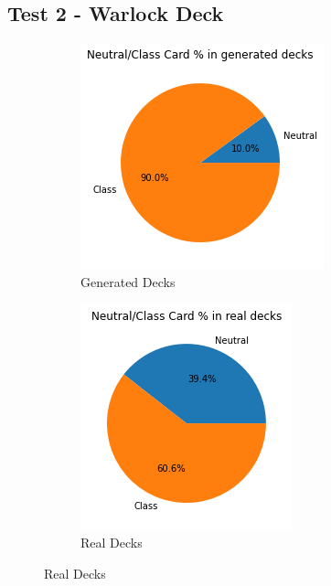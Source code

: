 \documentclass{report} %
\begin{document}
\subsection{Test 2 - Warlock Deck}
\begin{figure}[H]
\centering
\begin{subfigure}{.3\textwidth}
  \centering
  \includegraphics[width=.75\linewidth]{TestImages/NeutralSplitWarlockDecksFake}
  \caption{Generated Decks}
\end{subfigure}%
\begin{subfigure}{.3\textwidth}
  \centering
  \includegraphics[width=.75\linewidth]{TestImages/NeutralSplitWarlockDecksReal}
  \caption{Real Decks}
\end{subfigure}%

\end{figure}
\end{document}

